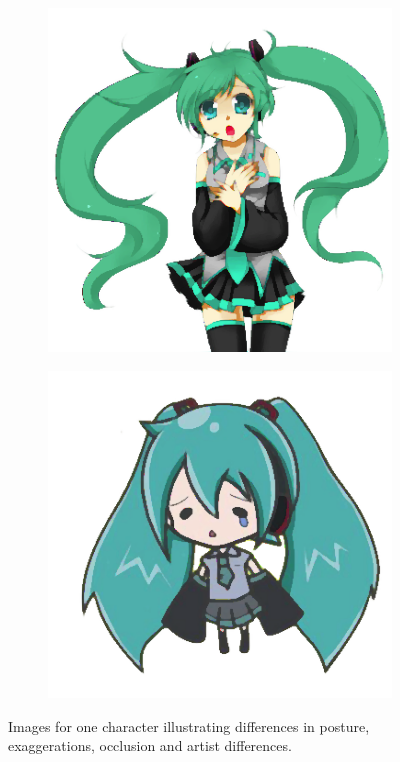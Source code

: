 \begin{figure}[htb!]
\begin{subfigure}{.3\textwidth}
\end{subfigure}
\begin{subfigure}{.3\textwidth}
\includegraphics[width=\textwidth]{images/miku_c.png}
\end{subfigure}
\begin{subfigure}{.3\textwidth}
\includegraphics[width=\textwidth]{images/miku_d.png}
\end{subfigure}
\caption{Images for one character illustrating differences in posture, exaggerations, occlusion and artist differences.}
\label{fig:animationImagesVariations}
\end{figure}

